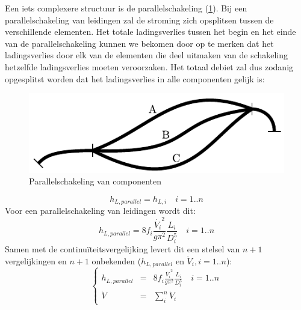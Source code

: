 Een iets complexere structuur is de parallelschakeling (\ref{fig:parallelschakeling}). Bij een parallelschakeling van leidingen zal de stroming zich opsplitsen tussen de verschillende elementen. Het totale ladingsverlies tussen het begin en het einde van de parallelschakeling kunnen we bekomen door op te merken dat het ladingsverlies door elk van de elementen die deel uitmaken van de schakeling hetzelfde ladingsverlies moeten veroorzaken. Het totaal debiet zal dus zodanig opgesplitst worden dat het ladingsverlies in alle componenten gelijk is:
\begin{figure}
	\centering
	\includegraphics{fig/leidingstelsels/parallelschakeling}
	\caption{Parallelschakeling van componenten}
	\label{fig:parallelschakeling}
\end{figure}
\begin{equation}
	h_{L,parallel} = h_{L,i} \quad i=1..n
\end{equation}
Voor een parallelschakeling van leidingen wordt dit:
\begin{equation}
	h_{L,parallel} = 8 f_i \frac{\dot{V_i}^2}{g \pi^2} \frac{L_i}{D^5_i} \quad i=1..n
\end{equation}
Samen met de continuïteitsvergelijking levert dit een stelsel van $n+1$ vergelijkingen en $n+1$ onbekenden ($h_{L,parallel}$ en $\dot{V}_i, i=1..n$):
\begin{equation}
	\left\{
	\begin{array}{lcl}
		h_{L,parallel} &=& 8 f_i \frac{\dot{V_i}^2}{g \pi^2} \frac{L_i}{D^5_i} \quad i=1..n \\
		\dot{V} &=& \sum_i^n \dot{V}_i
	\end{array}
	\right.
	\label{eqn:parallelschakeling}
\end{equation}

